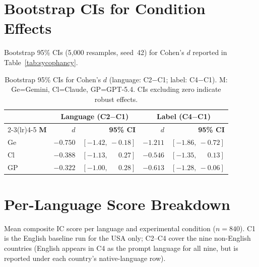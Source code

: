\documentclass[11pt]{article}
\begin{document}
\section{Bootstrap CIs for Condition Effects}
\label{app:condci}

Bootstrap 95\% CIs (5{,}000 resamples, seed~42) for Cohen's $d$ reported
in Table~\ref{tab:sycophancy}.

\begin{table}[H]
\scriptsize\centering
\begin{tabular}{lrrrr}
\toprule
& \multicolumn{2}{c}{\textbf{Language (C2$-$C1)}} & \multicolumn{2}{c}{\textbf{Label (C4$-$C1)}} \\
\cmidrule(lr){2-3}\cmidrule(lr){4-5}
\textbf{M} & \textbf{$d$} & \textbf{95\% CI} & \textbf{$d$} & \textbf{95\% CI} \\
\midrule
Ge & $-0.750$ & $[-1.42,\ -0.18]$ & $-1.211$ & $[-1.86,\ -0.72]$ \\
Cl & $-0.388$ & $[-1.13,\ \phantom{-}0.27]$ & $-0.546$ & $[-1.35,\ \phantom{-}0.13]$ \\
GP & $-0.322$ & $[-1.00,\ \phantom{-}0.28]$ & $-0.613$ & $[-1.28,\ -0.06]$ \\
\bottomrule
\end{tabular}
\caption{Bootstrap 95\% CIs for Cohen's $d$ (language: C2$-$C1;
label: C4$-$C1). M: Ge=Gemini, Cl=Claude, GP=GPT-5.4.
CIs excluding zero indicate robust effects.}
\end{table}

\section{Per-Language Score Breakdown}
\label{app:perlang}

Mean composite IC score per language and experimental condition ($n=840$).
C1 is the English baseline run for the USA only; C2--C4 cover the nine
non-English countries (English appears in C4 as the prompt language for all
nine, but is reported under each country's native-language row).
\end{document}
